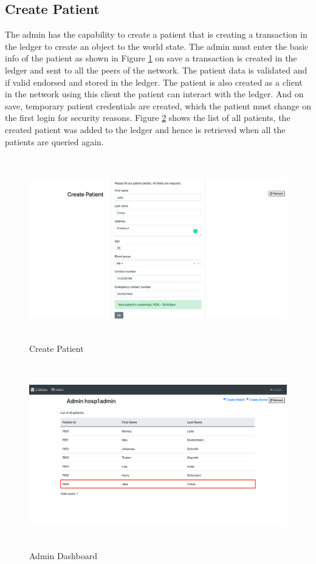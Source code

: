 \subsection{Create Patient}
The admin has the capability to create a patient that is creating a transaction in the ledger to create an object to the world state. The admin must enter the basic info of the patient as shown in Figure \ref{fig:chapter03:admin4} on save a transaction is created in the ledger and sent to all the peers of the network. The patient data is validated and if valid endorsed and stored in the ledger. The patient is also created as a client in the network using this client the patient can interact with the ledger. And on save, temporary patient credentials are created, which the patient must change on the first login for security reasons. Figure \ref{fig:chapter03:admin5} shows the list of all patients, the created patient was added to the ledger and hence is retrieved when all the patients are queried again.
\begin{figure}[htbp]
 \centering
 \includegraphics[height=8cm]{gfx/figures/admin4.png}
 \caption{Create Patient}
 \label{fig:chapter03:admin4}
\end{figure}
\begin{figure}[htbp]
 \centering
 \includegraphics[height=8cm]{gfx/figures/admin5.png}
 \caption{Admin Dashboard}
 \label{fig:chapter03:admin5}
\end{figure}


